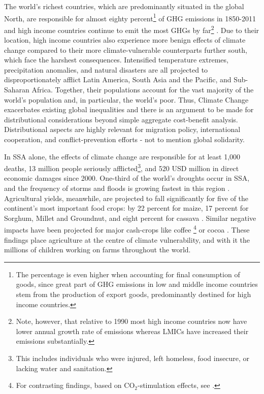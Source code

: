 \documentclass[a4paper,12pt]{article}
\theoremstyle{plain}
\theoremstyle{definition}
\theoremstyle{definition}
\theoremstyle{definition}
\theoremstyle{definition}
\begin{document}
The world's richest countries, which are predominantly situated in  the global North, are responsible for almost eighty percent\footnote{The percentage is even higher when accounting for final consumption of goods, since great part of GHG emissions in low and middle income countries stem from the production of export goods, predominantly destined for high income countries.} of GHG emissions in 1850-2011 and high income countries continue to emit the most GHGs by far\footnote{Note, however, that relative to 1990 most high income countries now have lower annual growth rate of emissions whereas LMICs have increased their emissions substantially.} \citep{Ritchie2017}. Due to their location, high income countries also experience more benign effects of climate change compared to their more climate-vulnerable counterparts further south, which face the harshest consequences. Intensified temperature extremes, precipitation anomalies, and natural disasters are all projected to disproportionately afflict Latin America, South Asia and the Pacific, and Sub-Saharan Africa. Together, their populations account for the vast majority of the world's population and, in particular, the world's poor. Thus, Climate Change exacerbates existing global inequalities and there is an argument to be made for distributional considerations beyond simple aggregate cost-benefit analysis. Distributional aspects are highly relevant for migration policy, international cooperation, and conflict-prevention efforts - not to mention global solidarity.

In SSA alone, the effects of climate change are responsible for at least 1,000 deaths, 13 million people seriously afflicted\footnote{This includes individuals who were injured, left homeless, food insecure, or lacking water and sanitation.}, and 520 USD million in direct economic damages since 2000. One-third of the world’s droughts occur in SSA, and the frequency of storms and floods is growing fastest in this region \citep{IMF2020}. Agricultural yields, meanwhile, are projected to fall significantly for five of the continent's most important food crops: by 22 percent for maize, 17 percent for Sorghum, Millet and Groundnut, and eight percent for cassava \citep{Schlenker2010}. Similar negative impacts have been projected for major cash-crops like coffee \citep{Craparo2015}\footnote{For contrasting findings, based on CO$_2$-stimulation effects, see \citet{DaMatta2019}.} or cocoa \citep{Boeckx2020}. These findings place agriculture at the centre of climate vulnerability, and with it the millions of children working on farms throughout the world.
\end{document}
